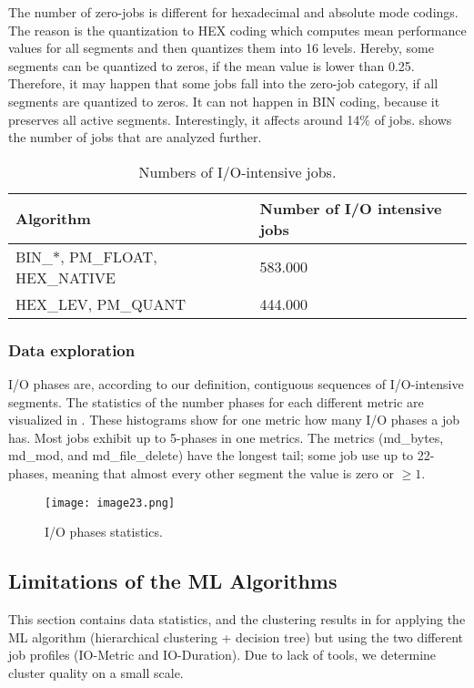\documentclass{jhps}
\begin{document}
The number of zero-jobs is different for hexadecimal and absolute mode codings.
The reason is the quantization to HEX coding which computes mean performance values for all segments and then quantizes them into 16 levels.
Hereby, some segments can be quantized to zeros, if the mean value is lower than 0.25.
Therefore, it may happen that some jobs fall into the zero-job category, if all segments are quantized to zeros.
It can not happen in BIN coding, because it preserves all active segments.
Interestingly, it affects around 14$\%$ of jobs.
 shows the number of jobs that are analyzed further.

\begin{table}
  \centering
  \begin{tabular}{ll}
    Algorithm & Number of I/O intensive jobs \\
    \hline
    BIN\_$\ast$, PM\_FLOAT, HEX\_NATIVE &  583.000 \\
    HEX\_LEV, PM\_QUANT &  444.000 \\
  \end{tabular}
  \caption{Numbers of I/O-intensive jobs.}
  \label{tab:n_intensive_jobs}
\end{table}


\subsubsection{Data exploration}
I/O phases are, according to our definition, contiguous sequences of I/O-intensive segments.
The statistics of the number phases for each different metric are visualized in .
These histograms show for one metric how many I/O phases a job has.
Most jobs exhibit up to 5-phases in one metrics.
The metrics (md\_bytes, md\_mod, and md\_file\_delete) have the longest tail; some job use up to 22-phases, meaning that almost every other segment the value is zero or $\geq 1$.



\begin{figure}
  \centering
  \texttt{[image: image23.png]}
  \caption{I/O phases statistics.}
  \label{fig:phases_stats}
\end{figure}


\subsection{Limitations of the ML Algorithms}
This section contains data statistics, and the clustering results in  for applying the ML algorithm (hierarchical clustering + decision tree) but using the two different job profiles (IO-Metric and IO-Duration).
Due to lack of tools, we determine cluster quality on a small scale.
\end{document}
